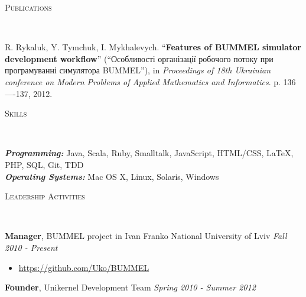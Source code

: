 \documentclass[9pt]{article}
\newenvironment{changemargin}[2]{%
  \begin{list}{}{%
    \setlength{\topsep}{0pt}%
    \setlength{\leftmargin}{#1}%
    \setlength{\rightmargin}{#2}%
    \setlength{\listparindent}{\parindent}%
    \setlength{\itemindent}{\parindent}%
    \setlength{\parsep}{\parskip}%
  }%
  \item[]}{\end{list}
}
\newcommand{\lineover}{
	\begin{changemargin}{-0.05in}{-0.05in}
		\vspace*{-8pt}
		\hrulefill \\
		\vspace*{-2pt}
	\end{changemargin}
}
\newcommand{\header}[1]{
	\begin{changemargin}{-0.5in}{-0.5in}
		\scshape{#1}\\
  	\lineover
	\end{changemargin}
}
\newenvironment{body} {
	\vspace*{-16pt}
	\begin{changemargin}{-0.25in}{-0.5in}
  }	
	{\end{changemargin}
}
\begin{document}
\smallskip

\header{Publications}

\begin{body}
	\vspace{14pt}
	R. Rykaluk, Y. Tymchuk, I. Mykhalevych. ``\textbf{Features of BUMMEL simulator development workflow}'' (``Особливості організації робочого потоку при програмуванні симулятора BUMMEL''), in \emph{Proceedings of 18th Ukrainian conference on Modern Problems of Applied Mathematics and Informatics}. p. 136—-137, 2012.\\

\end{body}

\smallskip

\header{Skills}

\begin{body}
	\vspace{14pt}
	\emph{\textbf{Programming:}}{} Java, Scala, Ruby, Smalltalk, JavaScript, HTML/CSS, \LaTeX, PHP, SQL, Git, TDD\\
	\medskip
	\emph{\textbf{Operating Systems:}}{} Mac OS X, Linux, Solaris, Windows\\
\end{body}

\smallskip


\header{Leadership Activities}

\begin{body}
	\vspace{14pt}
	\textbf{Manager}, BUMMEL project in Ivan Franko National University of Lviv \hfill{} \emph{Fall 2010 - Present}\\
	\vspace*{-4pt}
	\begin{itemize} \itemsep -0pt
		\item \url{https://github.com/Uko/BUMMEL}
	\end{itemize}
	\smallskip
	\textbf{Founder}, Unikernel Development Team \hfill {} \emph{Spring 2010 - Summer 2012}\\
\end{body}
\end{document}
